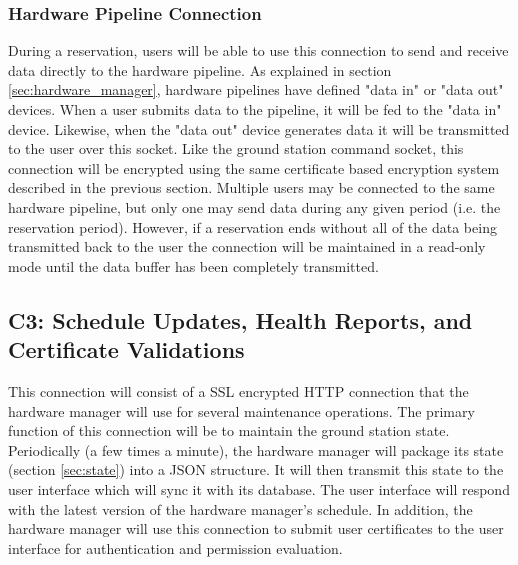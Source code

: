 \documentclass{mxl-design}
\begin{document}
\subsubsection{Hardware Pipeline Connection}
During a reservation, users will be able to use this connection to send and receive data directly to the hardware pipeline. As explained in section \ref{sec:hardware_manager}, hardware pipelines have defined "data in" or "data out" devices. When a user submits data to the pipeline, it will be fed to the "data in" device. Likewise, when the "data out" device generates data it will be transmitted to the user over this socket. Like the ground station command socket, this connection will be encrypted using the same certificate based encryption system described in the previous section. Multiple users may be connected to the same hardware pipeline, but only one may send data during any given period (i.e. the reservation period). However, if a reservation ends without all of the data being transmitted back to the user the connection will be maintained in a read-only mode until the data buffer has been completely transmitted.

\subsection{C3: Schedule Updates, Health Reports, and Certificate Validations}
\label{sec:connection_c3}
This connection will consist of a SSL encrypted HTTP connection that the hardware manager will use for several maintenance operations. The primary function of this connection will be to maintain the ground station state. Periodically (a few times a minute), the hardware manager will package its state (section \ref{sec:state}) into a JSON structure. It will then transmit this state to the user interface which will sync it with its database. The user interface will respond with the latest version of the hardware manager's schedule. In addition, the hardware manager will use this connection to submit user certificates to the user interface for authentication and permission evaluation.

\end{document}
